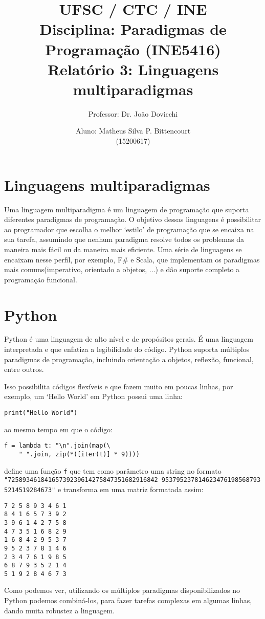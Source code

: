 \documentclass[letterpaper,twocolumn,10pt]{article}
\begin{document}
\title{
	\large \rm UFSC / CTC / INE\\
	\large \rm Disciplina: Paradigmas de Programação (INE5416)\\
	\Large \bf Relatório 3: Linguagens multiparadigmas
}

\author{
	Professor: Dr. João Dovicchi\\
	\and
	Aluno: Matheus Silva P. Bittencourt\\(15200617)
}

\maketitle

\thispagestyle{empty} %

\section{Linguagens multiparadigmas}

Uma linguagem multiparadigma é um linguagem de programação que suporta
diferentes paradigmas de programação. O objetivo dessas linguagens é
possibilitar ao programador que escolha o melhor `estilo' de programação que se
encaixa na sua tarefa, assumindo que nenhum paradigma resolve todos os
problemas da maneira mais fácil ou da maneira mais eficiente. Uma série de
linguagens se encaixam nesse perfil, por exemplo, F\# e Scala, que implementam
os paradigmas mais comuns(imperativo, orientado a objetos, ...) e dão suporte
completo a programação funcional.

\section{Python}

Python é uma linguagem de alto nível e de propósitos gerais. É uma linguagem
interpretada e que enfatiza a legibilidade do código. Python suporta múltiplos
paradigmas de programação, incluindo orientação a objetos, reflexão, funcional,
entre outros.

Isso possibilita códigos flexíveis e que fazem muito em poucas
linhas, por exemplo, um `Hello World' em Python possui uma linha:
\begin{verbatim}
print("Hello World")
\end{verbatim}
ao mesmo tempo em que o código:
\begin{verbatim}
f = lambda t: "\n".join(map(\
    " ".join, zip(*([iter(t)] * 9))))
\end{verbatim}
define uma função \texttt{f} que tem como parâmetro uma string no formato
\texttt{"72589346184165739239614275847351682916842\
9537952378146234761985687935214519284673"} e transforma em uma matriz formatada
assim:
\begin{verbatim}
7 2 5 8 9 3 4 6 1
8 4 1 6 5 7 3 9 2
3 9 6 1 4 2 7 5 8
4 7 3 5 1 6 8 2 9
1 6 8 4 2 9 5 3 7
9 5 2 3 7 8 1 4 6
2 3 4 7 6 1 9 8 5
6 8 7 9 3 5 2 1 4
5 1 9 2 8 4 6 7 3
\end{verbatim}

Como podemos ver, utilizando os múltiplos paradigmas disponibilizados no Python
podemos combiná-los, para fazer tarefas complexas em algumas linhas, dando
muita robustez a linguagem.
\end{document}
